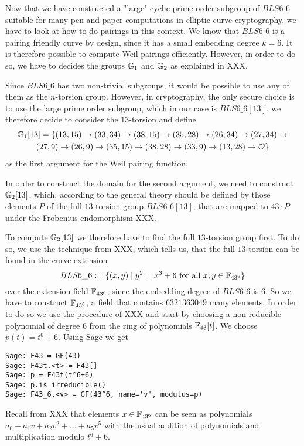 \endgroup

Now that we have constructed a "large" cyclic prime order subgroup of $BLS6\_6$ suitable for many pen-and-paper computations in elliptic curve cryptography, we have to look at how to do pairings in this context. We know that $BLS6\_6$ is a pairing friendly curve by design, since it has a small embedding degree $k=6$. It is therefore possible to compute Weil pairings efficiently. However, in order to do so, we have to decides the groups $\mathbb{G}_1$ and $\mathbb{G}_2$ as explained in XXX. 

Since $BLS6\_6$ has two non-trivial subgroups, it would be possible to use any of them as the $n$-torsion group. However, in cryptography, the only secure choice is to use the large prime order subgroup, which in our case is $BLS6\_6[13]$. we therefore decide to consider the $13$-torsion and define 
\begin{multline*}
\mathbb{G}_1[13]=\{(13,15) \rightarrow (33,34) \rightarrow  (38,15) \rightarrow  (35,28) \rightarrow (26,34) \rightarrow  (27,34) \rightarrow  \\ 
(27,9)  \rightarrow  (26,9) \rightarrow  (35,15) \rightarrow  (38,28) \rightarrow  (33,9) \rightarrow (13,28) \rightarrow  \mathcal{O}\}$$
\end{multline*}
as the first argument for the Weil pairing function.

In order to construct the domain for the second argument, we need to construct $\mathbb{G}_2[13]$, which, according to the general theory should be defined by those elements $P$ of the full $13$-torsion group $BLS6\_6[13]$, that are mapped to $43\cdot P$ under the Frobenius endomorphism XXX. 

To compute $\mathbb{G}_2[13]$ we therefore have to find the full $13$-torsion group first. To do so, we use the technique from XXX, which tells us, that the full $13$-torsion can be found in the curve extension 
\begin{equation}
BLS6\_6 := \{(x,y)\;|\; y^2 = x^3 + 6 \text{ for all } x,y \in \mathbb{F}_{43^6}\}
\end{equation}
over the extension field $\mathbb{F}_{43^6}$, since the embedding degree of $BLS6\_6$ is $6$. So we have to construct $\mathbb{F}_{43^6}$, a field that contains $6321363049$ many elements. In order to do so we use the procedure of XXX and start by choosing a non-reducible polynomial of degree $6$ from the ring of polynomials $\mathbb{F}_{43}[t]$. We choose $p(t) = t^6+6$. Using Sage we get
\begin{verbatim}
Sage: F43 = GF(43)
Sage: F43t.<t> = F43[]
Sage: p = F43t(t^6+6)
Sage: p.is_irreducible()
Sage: F43_6.<v> = GF(43^6, name='v', modulus=p)
\end{verbatim}
Recall from XXX that elements $x\in\mathbb{F}_{43^6}$ can be seen as polynomials $a_0+a_1v + a_2v^2+\ldots + a_5 v^5$ with the usual addition of polynomials and multiplication modulo $t^6+6$. 

